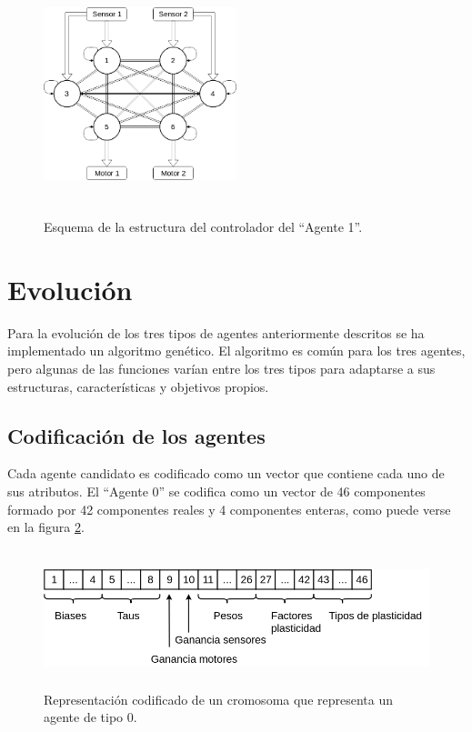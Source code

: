 \begin{figure}[H]
	\centering
	\includegraphics[width=0.5\textwidth,height=7cm]{Imagenes/Agent2Controller}
	\caption{Esquema de la estructura del controlador del ``Agente 1''.}
	\label{fig:a2Controller}
\end{figure}

\section{Evolución}
Para la evolución de los tres tipos de agentes anteriormente descritos se ha implementado un algoritmo genético. El algoritmo es común para los tres agentes, pero algunas de las funciones varían entre los tres tipos para adaptarse a sus estructuras, características y
objetivos propios.

\subsection{Codificación de los agentes}
Cada agente candidato es codificado como un vector que contiene cada uno de sus atributos. El ``Agente 0'' se codifica como un vector de 46 componentes formado por 42 componentes reales y 4 componentes enteras, como puede verse en la figura \ref{fig:vector0}.

\begin{figure}[H]
	\centering
	\includegraphics[width=1.0\textwidth,height=4cm]{Imagenes/vector0}
	\caption{Representación codificado de un cromosoma que representa un agente de tipo 0.}
	\label{fig:vector0}
\end{figure}

